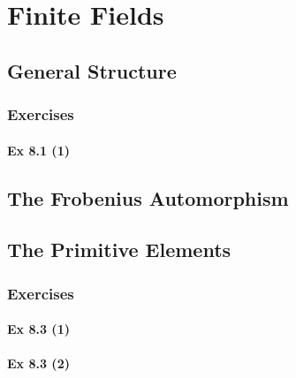 \setcounter{chapter}{0}
\renewcommand{\thechapter}{8}
\chapter{Finite Fields}\label{ch:8}
\setcounter{equation}{0}	        %

\section{General Structure}\label{sec:8.1}
\subsection{Exercises}\label{sec:8.1_Exercises}

\subsubsection{Ex 8.1 (1)}\label{sec:Ex_8.1.1}

\newpage		%

\section{The Frobenius Automorphism}\label{sec:8.2}

\section{The Primitive Elements}\label{sec:8.3}
\subsection{Exercises}\label{sec:8.3_Exercises}

\subsubsection{Ex 8.3 (1)}\label{sec:Ex_8.3.1}

\subsubsection{Ex 8.3 (2)}\label{sec:Ex_8.3.2}


